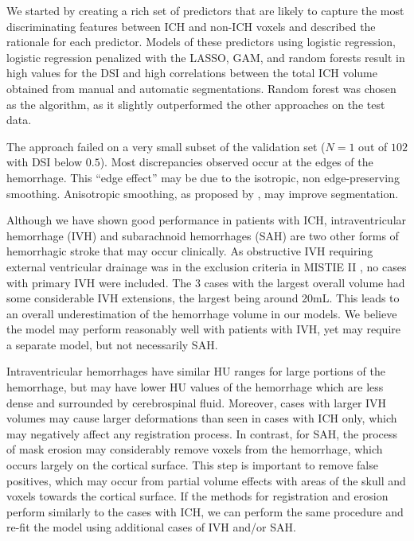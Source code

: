 \documentclass{elsarticle_nonatbib}\usepackage[]{graphicx}\usepackage[]{color}
\begin{document}
We started by creating a rich set of predictors that are likely to capture the most discriminating features between ICH and non-ICH voxels and described the rationale for each predictor.  Models of these predictors using logistic regression, logistic regression penalized with the LASSO, GAM, and random forests result in high values for the DSI and high correlations between the total ICH volume obtained from manual and automatic segmentations.  Random forest was chosen as the algorithm, as it slightly outperformed the other approaches on the test data.


The approach failed on a very small subset of the validation set ($N = 1$ out of $102$ with DSI below $0.5$). Most discrepancies observed occur at the edges of the hemorrhage.  This ``edge effect'' may be due to the isotropic, non edge-preserving smoothing.  Anisotropic smoothing, as proposed by \citet{perona1994anisotropic}, may improve segmentation.

Although we have shown good performance in patients with ICH, intraventricular hemorrhage (IVH) and subarachnoid hemorrhages (SAH) are two other forms of hemorrhagic stroke that may occur clinically.  As obstructive IVH requiring external ventricular drainage was in the exclusion criteria in MISTIE II \citep{mould_minimally_2013}, no cases with primary IVH were included.  The 3 cases with the largest overall volume had some considerable IVH extensions, the largest being around 20mL.  This leads to an overall underestimation of the hemorrhage volume in our models.  We believe the model may perform reasonably well with patients with IVH, yet may require a separate model, but not necessarily SAH.  

Intraventricular hemorrhages have similar HU ranges for large portions of the hemorrhage, but may have lower HU values of the hemorrhage which are less dense and surrounded by cerebrospinal fluid.  Moreover, cases with larger IVH volumes may cause larger deformations than seen in cases with ICH only, which may negatively affect any registration process. In contrast, for SAH, the process of mask erosion may considerably remove voxels from the hemorrhage, which occurs largely on the cortical surface.  This step is important to remove false positives, which may occur from partial volume effects with areas of the skull and voxels towards the cortical surface. If the methods for registration and erosion perform similarly to the cases with ICH, we can perform the same procedure and re-fit the model using additional cases of IVH and/or SAH.
\end{document}
